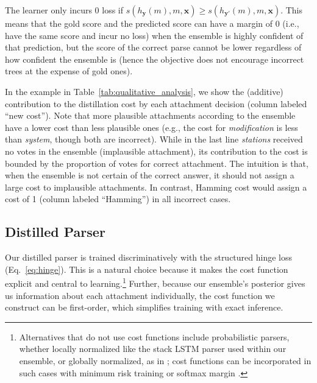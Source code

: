 \documentclass[11pt,letterpaper]{article}
\newcommand{\ignore}[1]{}
\newcommand{\nascomment}[1]{\ignore{\textcolor{blue}{{\textbf{[#1 --\textsc{nas}]}}}}}
\begin{document}
The learner only incurs 0 loss if $s(h_{\boldsymbol{y}}(m), m, \boldsymbol{x}) \geq s(h_{\boldsymbol{y'}}(m), m, \boldsymbol{x})$. This means that the gold score and the predicted score can have a margin of 0 (i.e., have the same score and incur no loss) when the ensemble is highly confident of that prediction, but the score of the correct parse cannot be lower regardless of how confident the ensemble is (hence the objective does not encourage incorrect trees at the expense of gold ones).




\ignore{\nascomment{I've removed claims about overfitting; I don't think that's the right way to motivate differentiating different types of errors}}

In the example in Table~\ref{tab:qualitative_analysis}, we show the (additive) contribution to the distillation cost by each attachment decision (column labeled ``new cost'').  Note that more plausible attachments according to the ensemble have a lower cost than less plausible ones (e.g., the cost for \emph{modification} is less than \emph{system}, though both are incorrect). While in the last line \emph{stations} received no votes in the ensemble (implausible attachment), its contribution to the cost is bounded by the proportion of votes for correct attachment. The intuition is that, when the ensemble is not certain of the correct answer, it should not assign a large cost to implausible attachments. In contrast, Hamming cost would assign a cost of 1 (column labeled ``Hamming'') in all incorrect cases.


















\subsection{Distilled Parser}
Our distilled parser is trained  discriminatively with the structured hinge loss (Eq.~\ref{eq:hinge}).  This is a natural choice because it makes the cost function explicit and central to learning.\footnote{Alternatives that do not use cost functions include probabilistic parsers, whether locally normalized like the stack LSTM parser used within our ensemble, or globally normalized, as in ; cost functions can be incorporated in such cases with minimum risk training \cite{smith-eisner:2006:POS} or softmax margin \cite{gimpel2010softmax}.}  Further, because our ensemble's posterior
gives us information about each attachment individually, the cost function we construct can be first-order, which simplifies training with exact inference.  
\end{document}
